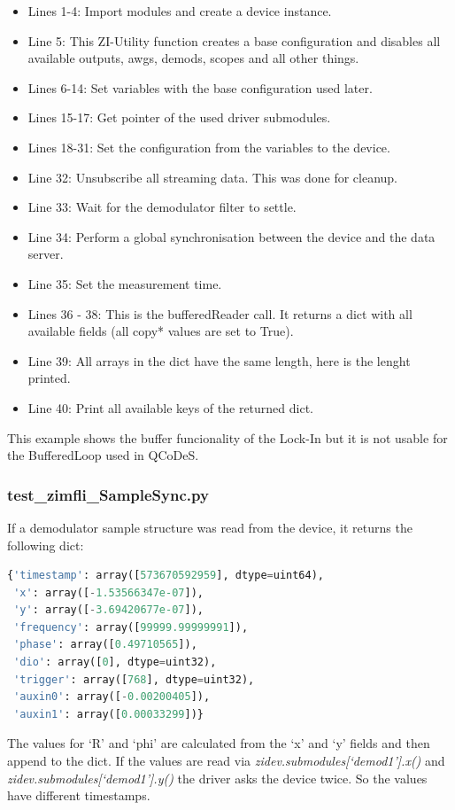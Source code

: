 \documentclass[11pt]{article} %
\begin{document}
\begin{itemize}[]
\itemsep0pt
\item Lines 1-4: Import modules and create a device instance.
\item Line 5: This ZI-Utility function creates a base configuration and disables all available outputs, awgs, demods, scopes and all other things.
\item Lines 6-14: Set variables with the base configuration used later.
\item Lines 15-17: Get pointer of the used driver submodules.
\item Lines 18-31: Set the configuration from the variables to the device.
\item Line 32: Unsubscribe all streaming data. This was done for cleanup.
\item Line 33: Wait for the demodulator filter to settle.
\item Line 34: Perform a global synchronisation between the device and the data server.
\item Line 35: Set the measurement time.
\item Lines 36 - 38: This is the bufferedReader call. It returns a dict with all available fields (all copy* values are set to True).
\item Line 39: All arrays in the dict have the same length, here is the lenght printed.
\item Line 40: Print all available keys of the returned dict.
\end{itemize}

This example shows the buffer funcionality of the Lock-In but it is not usable for the BufferedLoop used in QCoDeS.


\subsubsection{test\_zimfli\_SampleSync.py}
If a demodulator sample structure was read from the device, it returns the following dict:
\begin{lstlisting}[frame=single, language=Python, xleftmargin=1cm]
{'timestamp': array([573670592959], dtype=uint64),
 'x': array([-1.53566347e-07]),
 'y': array([-3.69420677e-07]),
 'frequency': array([99999.99999991]),
 'phase': array([0.49710565]),
 'dio': array([0], dtype=uint32),
 'trigger': array([768], dtype=uint32),
 'auxin0': array([-0.00200405]),
 'auxin1': array([0.00033299])}
\end{lstlisting}
The values for `R' and `phi' are calculated from the `x' and `y' fields and then append to the dict. If the values are read via {\it zidev.submodules[`demod1'].x()} and {\it zidev.submodules[`demod1'].y()} the driver asks the device twice. So the values have different timestamps.
\end{document}
